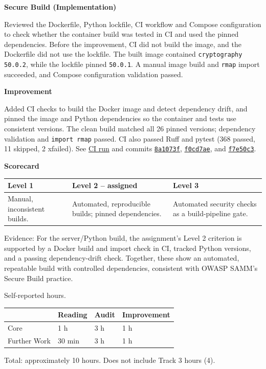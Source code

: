 \documentclass[10pt,a4paper]{article}
\newcommand{\sectionheading}[1]{\par\vspace{0.8em}{\large\bfseries #1}\par\nobreak}
\newcommand{\subheading}[1]{\par\vspace{0.25em}\textbf{#1}\par\nobreak}
\begin{document}
\sectionheading{2. Further Work}
\subheading{Secure Build (Implementation)}
Reviewed the Dockerfile, Python lockfile, CI workflow and Compose configuration
to check whether the container build was tested in CI and used the pinned
dependencies. Before the improvement, CI did not build the image, and the
Dockerfile did not use the lockfile. The built image contained
\texttt{cryptography 50.0.2}, while the lockfile pinned \texttt{50.0.1}.
A manual image build and \texttt{rmap} import succeeded, and Compose
configuration validation passed.

\subheading{Improvement}
Added CI checks to build the Docker image and detect dependency drift, and pinned
the image and Python dependencies so the container and tests use consistent
versions. The clean build matched all 26 pinned versions; dependency validation
and \texttt{import rmap} passed. CI also passed Ruff and pytest (368 passed,
11 skipped, 2 xfailed). See
\href{https://github.com/chirichexe/tatou-2026/actions/runs/36756093546}{CI run}
and commits
\href{https://github.com/chirichexe/tatou-2026/commit/8a1073f7b43b87a0fefb77366456fb2a4518a76c}{\texttt{8a1073f}},
\href{https://github.com/chirichexe/tatou-2026/commit/f0cd7aef43f7857a6e610fd0189cc04da6c0e4e1}{\texttt{f0cd7ae}},
and
\href{https://github.com/chirichexe/tatou-2026/commit/f7e50c307136f364113cbdd55ce0822dc94618c5}{\texttt{f7e50c3}}.

\subheading{Scorecard}
\par\begin{tabularx}{\linewidth}{@{}LHL@{}}
\toprule
\textbf{Level 1} & \textbf{Level 2 -- assigned} & \textbf{Level 3} \\
\midrule
Manual, inconsistent builds. & Automated, reproducible builds; pinned dependencies. & Automated security checks as a build-pipeline gate. \\
\bottomrule
\end{tabularx}\par
Evidence: For the server/Python build, the assignment's Level 2 criterion is
supported by a Docker build and import check in CI, tracked Python versions,
and a passing dependency-drift check. Together, these show an automated,
repeatable build with controlled dependencies, consistent with OWASP SAMM's
Secure Build practice.

\sectionheading{3. Hours}
{\small Self-reported hours.}\par
\begin{tabularx}{\linewidth}{@{}lXXX@{}}
\toprule
 & \textbf{Reading} & \textbf{Audit} & \textbf{Improvement} \\
\midrule
Core & 1 h & 3 h & 1 h \\
Further Work & 30 min & 3 h & 1 h \\
\bottomrule
\end{tabularx}\par
{\small Total: approximately 10 hours. Does not include Track 3 hours (4).}
\end{document}
